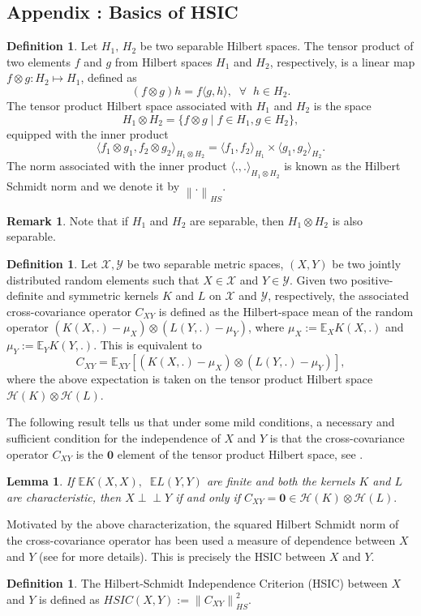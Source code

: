 \documentclass[11pt]{article}
\newcommand{\indep}{\perp \!\!\! \perp}
\newcommand{\bE}{\mathbb{E}}
\theoremstyle{plain}
\newtheorem{lemma}[theorem]{Lemma}
\theoremstyle{definition}
\newtheorem{definition}[theorem]{Definition}
\newtheorem{remark}{Remark}
\theoremstyle{remark}
\begin{document}
\begin{appendix}
\section*{Appendix \thesection: Basics of HSIC}\label{appnb}
\begin{definition}\label{defn:HS_norm}
     Let $H_1,\,H_2$ be two separable Hilbert spaces. The tensor product of two elements $f$ and $g$ from Hilbert spaces $H_1$ and $H_2$, respectively, is a linear map $f \otimes g: H_2\mapsto H_1$, defined as
$$(f\otimes g)h=f\langle g,h\rangle,\;\;\forall\;\;h\in H_2.$$
The tensor product Hilbert space associated with $H_1$ and $H_2$ is the space
$$H_1 \otimes H_2=\{f \otimes g\mid f\in H_1,g \in H_2\},$$
equipped with the inner product
$$\langle f_1\otimes g_1, f_2 \otimes g_2\rangle_{H_1 \otimes H_2}=\langle f_1,f_2\rangle_{H_1}\times \langle g_1,g_2\rangle_{H_2}.$$
The norm associated with the inner product $\langle .,. \rangle_{H_1 \otimes H_2}$ is known as the Hilbert Schmidt norm and we denote it by $\left\|.\right\|_{HS}.$
\end{definition}
\begin{remark}
    Note that if $H_1$ and $H_2$ are separable, then $H_1\otimes H_2$ is also separable. 
\end{remark}
\begin{definition}
    Let $\mathcal{X},\mathcal{Y}$ be two separable metric spaces, $(X,Y)$ be two jointly distributed random elements such that $X\in \mathcal{X}$ and $Y\in \mathcal{Y}$. Given two positive-definite and symmetric kernels $K$ and $L$ on $\mathcal{X}$ and $\mathcal{Y}$, respectively, the associated cross-covariance operator $C_{XY}$ is defined as the Hilbert-space mean of the random operator $\left(K(X,.)-\mu_X\right)\otimes \left(L(Y,.)-\mu_Y\right)$, where $\mu_X:=\bE_X K(X,.)$ and $\mu_Y:=\bE_Y K(Y,.).$ This is equivalent to
$$C_{XY}=\bE_{XY}\left[\left(K(X,.)-\mu_X\right)\otimes \left(L(Y,.)-\mu_Y\right)\right],$$
where the above expectation is taken on the tensor product Hilbert space $\mathcal{H}(K)\otimes \mathcal{H}(L).$
\end{definition}
The following result tells us that under some mild conditions, a necessary and sufficient condition for the independence of $X$ and $Y$ is that the cross-covariance operator $C_{XY}$ is the $\mathbf{0}$ element of the tensor product Hilbert space, see \cite{sejdinovic2013equivalence}.
\begin{lemma}\label{lemma:HSIC=0_iff_indep}
If $\bE K(X,X),\;\;\bE L(Y,Y)$ are finite and both the kernels $K$ and $L$ are characteristic, then
$X\indep Y$ if and only if $C_{XY}=\mathbf{0}\in \mathcal{H}(K)\otimes \mathcal{H}(L).$
\end{lemma}
Motivated by the above characterization, the squared Hilbert Schmidt norm of the cross-covariance operator has been used a measure of dependence between $X$ and $Y$ (see \cite{gretton2005measuring} for more details). This is precisely the HSIC between $X$ and $Y$.
\begin{definition}
    The Hilbert-Schmidt Independence Criterion (HSIC) between $X$ and $Y$ is defined as $HSIC(X,Y):=\left\|C_{XY}\right\|^2_{HS}.$
\end{definition}

\end{appendix}
\end{document}
